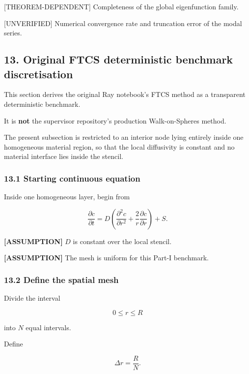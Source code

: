 \documentclass[11pt,a4paper]{article}
\begin{document}
[THEOREM-DEPENDENT] Completeness of the global eigenfunction family.

[UNVERIFIED] Numerical convergence rate and truncation error of the modal series.

\subsection*{13. Original FTCS deterministic benchmark discretisation}

This section derives the original Ray notebook's FTCS method as a transparent deterministic benchmark.

It is \textbf{not} the supervisor repository's production Walk-on-Spheres method.

The present subsection is restricted to an interior node lying entirely inside one homogeneous material region, so that the local diffusivity is constant and no material interface lies inside the stencil.

\subsubsection*{13.1 Starting continuous equation}

Inside one homogeneous layer, begin from

\begin{equation}
\frac{\partial c}{\partial t}
=
D
\left(
\frac{\partial^2c}{\partial r^2}
+
\frac2r\frac{\partial c}{\partial r}
\right)
+
S.
\tag{TRISO-DIS-100}
\label{eq:triso-dis-100}
\end{equation}

\textbf{[ASSUMPTION]} $D$ is constant over the local stencil.

\textbf{[ASSUMPTION]} The mesh is uniform for this Part-I benchmark.

\subsubsection*{13.2 Define the spatial mesh}

Divide the interval

\begin{equation}
0\le r\le R
\tag{TRISO-DIS-101}
\label{eq:triso-dis-101}
\end{equation}

into $N$ equal intervals.

Define

\begin{equation}
\Delta r=\frac{R}{N}.
\tag{TRISO-DIS-102}
\label{eq:triso-dis-102}
\end{equation}
\end{document}
